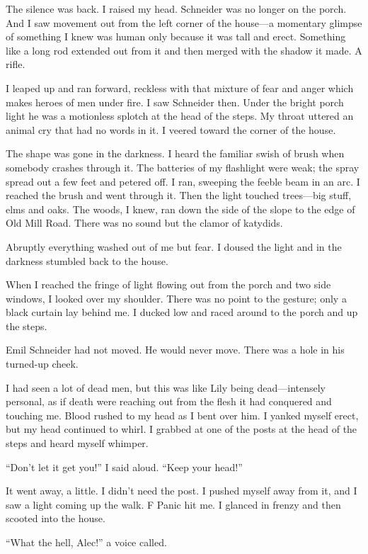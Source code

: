 \documentclass{novel}
\begin{document}
The silence was back. I raised my head. Schneider was no longer on the porch. And I saw movement out from the left corner of the house—a momentary glimpse of something I knew was human only because it was tall and erect. Something like a long rod extended out from it and then merged with the shadow it made. A rifle.

I leaped up and ran forward, reckless with that mixture of fear and anger which makes heroes of men under fire. I saw Schneider then. Under the bright porch light he was a motionless splotch at the head of the steps. My throat uttered an animal cry that had no words in it. I veered toward the corner of the house.

The shape was gone in the darkness. I heard the familiar swish of brush when somebody crashes through it. The batteries of my flashlight were weak; the spray spread out a few feet and petered off. I ran, sweeping the feeble beam in an arc. I reached the brush and went through it. Then the light touched trees—big stuff, elms and oaks. The woods, I knew, ran down the side of the slope to the edge of Old Mill Road. There was no sound but the clamor of katydids.

Abruptly everything washed out of me but fear. I doused the light and in the darkness stumbled back to the house. 

When I reached the fringe of light flowing out from the porch and two side windows, I looked over my shoulder. There was no point to the gesture; only a black curtain lay behind me. I ducked low and raced around to the porch and up the steps.

Emil Schneider had not moved. He would never move. There was a hole in his turned-up cheek.

I had seen a lot of dead men, but this was like Lily being dead—intensely personal, as if death were reaching out from the flesh it had conquered and touching me. Blood rushed to my head as I bent over him. I yanked myself erect, but my head continued to whirl. I grabbed at one of the posts at the head of the steps and heard myself whimper.

“Don’t let it get you!” I said aloud. “Keep your head!”

\scenestars

It went away, a little. I didn’t need the post. I pushed myself away from it, and I saw a light coming up the walk.
F
Panic hit me. I glanced in frenzy and then scooted into the house.

“What the hell, Alec!” a voice called.
\end{document}
